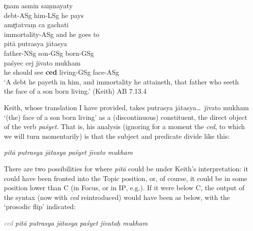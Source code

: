 \documentclass[output=paper,
modfonts
]{LSP/langsci}
\begin{document}
\begin{exe}
\ex\label{AB7}
	\gll r̥nam asmin saṃnayaty \\
		debt-ASg him-LSg {he pays} \\
		
	\gll amr̥tatvaṃ ca gachati \\
		immortality-ASg and {he goes to} \\
		
	\gll pitā putrasya jātasya \\
		father-NSg son-GSg born-GSg \\
		
	\gll paśyec cej jīvato mukham \\
		{he should see} \textbf{ced} living-GSg face-ASg \\
	\glt `A debt he payeth in him, and immortality he attaineth, that father who seeth the face of a son born living.' (Keith) \hfill {AB 7.13.4}
\end{exe}

\noindent Keith, whose translation I have provided, takes {\ob}putrasya jātasya\ldots\ jīvato mukham{\cb} `(the) face of a son born living' as a (discontinuous) constituent, the direct object of the verb \textit{paśyet}. That is, his analysis (ignoring for a moment
the \textit{ced}, to which we will turn momentarily) is that the subject and predicate divide like this:

\begin{exe}
	\ex
{\ob}\textit{pitā}{\cb} {\ob}\textit{putrasya jātasya paśyet jīvato mukham}{\cb}
\end{exe}

\noindent There are two possibilities for where \textit{pitā} could be under Keith's interpretation: it could have been fronted into the Topic position, or,
of course, it could be in some position lower than C (in Focus, or in \textsc{IP}, e.g.). If it were below C, the output
of the syntax (now with \textit{ced} reintroduced) would have been as below, with the `prosodic flip' indicated:

\vspace*{1ex}
\begin{exe}\ex
{\ob} {\textcolor{gray}{\textit{ced}}} {\ob}\textit{pitā  putrasya jātasya paśyet jīvataḥ mukham}{\cb}{\cb} 
\end{exe}
\end{document}
